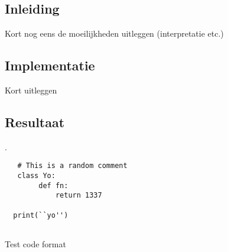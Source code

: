 \subsection{Inleiding}
Kort nog eens de moeilijkheden uitleggen (interpretatie etc.)
\subsection{Implementatie}
Kort uitleggen
\subsection{Resultaat}
.
\begin{listing}[H]
\begin{verbatim}
   # This is a random comment
   class Yo:
        def fn:
            return 1337
   
  print(``yo'')
  
\end{verbatim}
\caption{Test code format}
\end{listing}